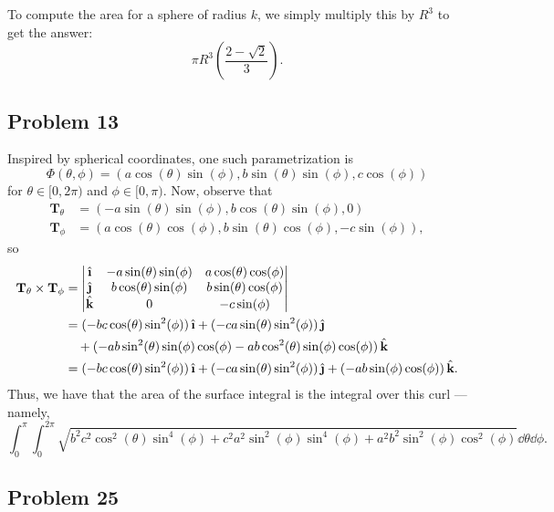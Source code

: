 \documentclass[11pt]{article}
\newcommand{\uvec}[1]{\mathop{} \!\hat{\textbf{#1}}}
\begin{document}
To compute the area for a sphere of radius $k$, we simply multiply this by $R^{3}$ to get the answer:
\[
	\boxed{\pi R^{3} \left( \frac{2 - \sqrt{2}}{3} \right)}.
\]


\subsection*{Problem 13}

Inspired by spherical coordinates, one such parametrization is
\[
	\boxed{\Phi(\theta, \phi) = (a \cos(\theta)\sin(\phi), b \sin(\theta)\sin(\phi), c \cos(\phi))}
\]
for $\theta \in [0, 2\pi)$ and $\phi \in [0, \pi)$. Now, observe that 
\begin{align*}
	\mathbf{T}_{\theta} &= (-a \sin(\theta)\sin(\phi), b \cos(\theta) \sin(\phi), 0) \\
	\mathbf{T}_{\phi} &= (a \cos(\theta)\cos(\phi), b \sin(\theta)\cos(\phi), -c \sin(\phi)),
\end{align*}
so
\begin{align*}
	\mathbf{T}_{\theta} \times \mathbf{T}_{\phi} &= \begin{vmatrix} \uvec{\i} & -a \sin(\theta)\sin(\phi) & a \cos(\theta) \cos(\phi) \\ \uvec{\j} & b \cos(\theta) \sin(\phi) & b \sin(\theta) \cos(\phi) \\ \uvec{k} & 0 & -c \sin(\phi) \end{vmatrix} \\
	&= (-bc \cos(\theta) \sin^{2}(\phi)) \uvec{\i} + (-ca \sin(\theta)\sin^{2}(\phi)) \uvec{\j} \\
	& \quad + (-ab \sin^{2}(\theta)\sin(\phi)\cos(\phi) - ab \cos^{2}(\theta) \sin(\phi) \cos(\phi)) \uvec{k} \\
	&= (-bc \cos(\theta) \sin^{2}(\phi)) \uvec{\i} + (-ca \sin(\theta)\sin^{2}(\phi)) \uvec{\j} + (-ab \sin(\phi) \cos(\phi)) \uvec{k}.
\end{align*}
Thus, we have that the area of the surface integral is the integral over this curl --- namely,
\[
	\boxed{\int_{0}^{\pi} \int_{0}^{2\pi} \sqrt{b^{2}c^{2}\cos^{2}(\theta)\sin^{4}(\phi) + c^{2}a^{2}\sin^{2}(\phi)\sin^{4}(\phi) + a^{2}b^{2}\sin^{2}(\phi)\cos^{2}(\phi)} \dd{\theta} \dd{\phi}}.
\]


\subsection*{Problem 25}
\end{document}
